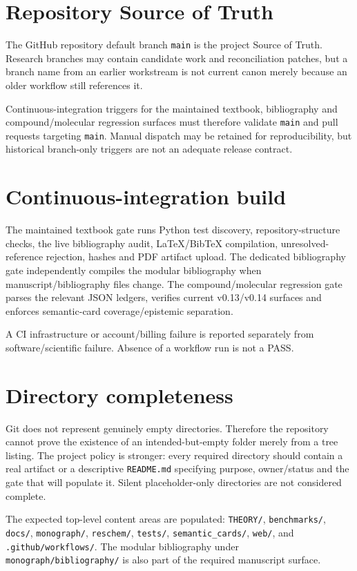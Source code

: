\section{Repository Source of Truth}
The GitHub repository default branch \texttt{main} is the project Source of Truth.  Research branches may contain candidate work and reconciliation patches, but a branch name from an earlier workstream is not current canon merely because an older workflow still references it.

Continuous-integration triggers for the maintained textbook, bibliography and compound/molecular regression surfaces must therefore validate \texttt{main} and pull requests targeting \texttt{main}.  Manual dispatch may be retained for reproducibility, but historical branch-only triggers are not an adequate release contract.

\section{Continuous-integration build}
The maintained textbook gate runs Python test discovery, repository-structure checks, the live bibliography audit, LaTeX/BibTeX compilation, unresolved-reference rejection, hashes and PDF artifact upload.  The dedicated bibliography gate independently compiles the modular bibliography when manuscript/bibliography files change.  The compound/molecular regression gate parses the relevant JSON ledgers, verifies current v0.13/v0.14 surfaces and enforces semantic-card coverage/epistemic separation.

A CI infrastructure or account/billing failure is reported separately from software/scientific failure.  Absence of a workflow run is not a PASS.

\section{Directory completeness}
Git does not represent genuinely empty directories.  Therefore the repository cannot prove the existence of an intended-but-empty folder merely from a tree listing.  The project policy is stronger: every required directory should contain a real artifact or a descriptive \texttt{README.md} specifying purpose, owner/status and the gate that will populate it.  Silent placeholder-only directories are not considered complete.

The expected top-level content areas are populated: \texttt{THEORY/}, \texttt{benchmarks/}, \texttt{docs/}, \texttt{monograph/}, \texttt{reschem/}, \texttt{tests/}, \texttt{semantic\_cards/}, \texttt{web/}, and \texttt{.github/workflows/}.  The modular bibliography under \texttt{monograph/bibliography/} is also part of the required manuscript surface.

